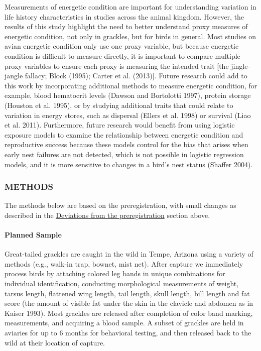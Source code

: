 \documentclass[
]{article}
\begin{document}
Measurements of energetic condition are important for understanding
variation in life history characteristics in studies across the animal
kingdom. However, the results of this study highlight the need to better
understand proxy measures of energetic condition, not only in grackles,
but for birds in general. Most studies on avian energetic condition only
use one proxy variable, but because energetic condition is difficult to
measure directly, it is important to compare multiple proxy variables to
ensure each proxy is measuring the intended trait {[}the jingle-jangle
fallacy; Block (1995); Carter et al. (2013){]}. Future research could
add to this work by incorporating additional methods to measure
energetic condition, for example, blood hematocrit levels (Dawson and
Bortolotti 1997), protein storage (Houston et al. 1995), or by studying
additional traits that could relate to variation in energy stores, such
as dispersal (Ellers et al. 1998) or survival (Liao et al. 2011).
Furthermore, future research would benefit from using logistic exposure
models to examine the relationship between energetic condition and
reproductive success because these models control for the bias that
arises when early nest failures are not detected, which is not possible
in logistic regression models, and it is more sensitive to changes in a
bird's nest status (Shaffer 2004).

\pagebreak

\hypertarget{methods}{%
\subsubsection{METHODS}\label{methods}}

The methods below are based on the preregistration, with small changes
as described in the
\protect\hyperlink{associated-preregistration}{Deviations from the
preregistration} section above.

\hypertarget{planned-sample}{%
\paragraph{\texorpdfstring{\textbf{Planned
Sample}}{Planned Sample}}\label{planned-sample}}

Great-tailed grackles are caught in the wild in Tempe, Arizona using a
variety of methods (e.g., walk-in trap, bownet, mist net). After capture
we immediately process birds by attaching colored leg bands in unique
combinations for individual identification, conducting morphological
measurements of weight, tarsus length, flattened wing length, tail
length, skull length, bill length and fat score (the amount of visible
fat under the skin in the clavicle and abdomen as in Kaiser 1993). Most
grackles are released after completion of color band marking,
measurements, and acquiring a blood sample. A subset of grackles are
held in aviaries for up to 6 months for behavioral testing, and then
released back to the wild at their location of capture.
\end{document}
